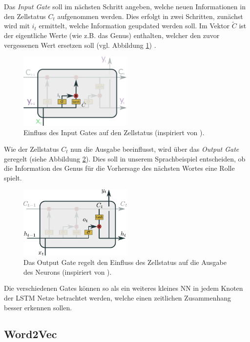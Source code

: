         Das \textit{Input Gate} soll im nächsten Schritt angeben, welche neuen Informationen in den Zellstatus $C_t$ aufgenommen werden.
        Dies erfolgt in zwei Schritten, zunächst wird mit $i_t$ ermittelt, welche Information geupdated werden soll.
        Im Vektor $\tilde{C}$ ist der eigentliche Werte (wie z.B. das Genus) enthalten, welcher den zuvor vergessenen Wert ersetzen soll (vgl. Abbildung \ref{fig:LSTM_Input}) . 
            \begin{figure}[ht]
                \centering
                \includegraphics[width=0.5\textwidth]{images/Illustrationen/LSTM_IG2}
                \caption{Einfluss des Input Gates auf den Zellstatus (inspiriert von \cite{OLAH2015}).}
                \label{fig:LSTM_Input}
            \end{figure}
        
        Wie der Zellstatus $C_t$ nun die Ausgabe beeinflusst, wird über das \textit{Output Gate} geregelt (siehe Abbildung \ref{fig:LSTM_Output}).
        Dies soll in unserem Sprachbeispiel entscheiden, ob die Information des Genus für die Vorhersage des nächsten Wortes eine Rolle spielt. \cite{GERS2000} \cite{OLAH2015}
            \begin{figure}[ht]
                \centering
                \includegraphics[width=0.5\textwidth]{images/Illustrationen/LSTM_OG}
                \caption{Das Output Gate regelt den Einfluss des Zellstatus auf die Ausgabe des Neurons (inspiriert von \cite{OLAH2015}).}
                \label{fig:LSTM_Output}
            \end{figure}
        
        Die verschiedenen Gates können so als ein weiteres kleines NN in jedem Knoten der LSTM Netze betrachtet werden, welche einen zeitlichen Zusammenhang besser erkennen sollen.
    
        \subsection{Word2Vec}

